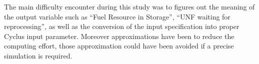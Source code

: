 \documentclass[12pt]{article}
\begin{document}
The main difficulty encounter during this study was to figures out the meaning
of the output variable such as ``Fuel Resource in Storage'', ``UNF waiting for
reprocessing'', as well as the conversion of the input specification into proper
Cyclus input parameter. Moreover approximations have been to reduce the
computing effort, those approximation could have been avoided if a precise
simulation is required.







\end{document}
